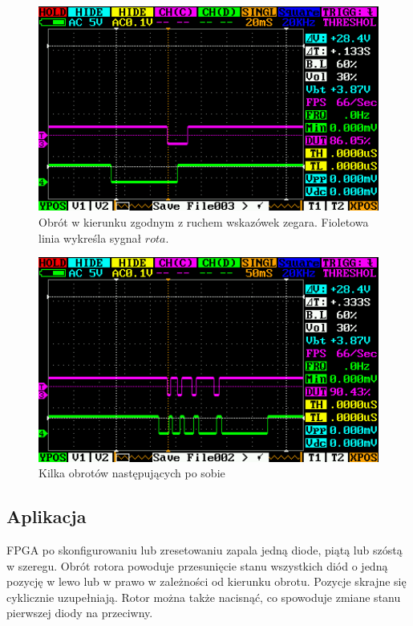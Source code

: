 \documentclass[a4paper,12pt]{article}
\begin{document}
\begin{figure}[htb]
   \centering
   \includegraphics[width=13cm]{grafika/dso/rotor-w-prawo-jeden.png}
   \caption{Obrót w kierunku zgodnym z ruchem wskazówek zegara. Fioletowa linia wykreśla sygnał $rota$.}
\end{figure}

\begin{figure}[htb]
   \centering
   \includegraphics[width=13cm]{grafika/dso/rotor-w-prawo-wiele.png}
   \caption{Kilka obrotów następujących po sobie}
\end{figure}

\subsection{Aplikacja}

FPGA po skonfigurowaniu lub zresetowaniu zapala jedną diode, piątą lub szóstą w szeregu. Obrót rotora powoduje przesunięcie stanu wszystkich diód o jedną pozycję w lewo lub w prawo w zależności od kierunku obrotu. Pozycje skrajne się cyklicznie uzupełniają. Rotor można także nacisnąć, co spowoduje zmiane stanu pierwszej diody na przeciwny.
\end{document}
